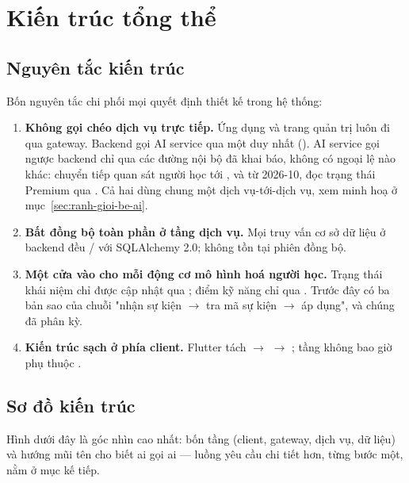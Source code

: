 \chapter{Kiến trúc tổng thể}

\section{Nguyên tắc kiến trúc}

Bốn nguyên tắc chi phối mọi quyết định thiết kế trong hệ thống:

\begin{enumerate}[leftmargin=1.4em]
  \item \textbf{Không gọi chéo dịch vụ trực tiếp.} Ứng dụng và trang quản trị luôn đi
  qua gateway. Backend gọi AI service qua một  duy nhất
  (). AI service gọi ngược backend chỉ qua
  các đường nội bộ đã khai báo, không có ngoại lệ nào khác: chuyển tiếp quan sát
  người học tới , và từ 2026-10, đọc trạng thái
  Premium qua . Cả hai dùng chung một
   dịch vụ-tới-dịch vụ, xem minh hoạ ở mục~\ref{sec:ranh-gioi-be-ai}.
  \item \textbf{Bất đồng bộ toàn phần ở tầng dịch vụ.} Mọi truy vấn cơ sở dữ liệu ở
  backend đều / với SQLAlchemy 2.0; không tồn tại phiên đồng bộ.
  \item \textbf{Một cửa vào cho mỗi động cơ mô hình hoá người học.} Trạng thái khái niệm
  chỉ được cập nhật qua ; điểm kỹ năng chỉ qua
  . Trước đây có ba bản sao của chuỗi
  "nhận sự kiện $\rightarrow$ tra mã sự kiện $\rightarrow$ áp dụng", và chúng đã phân kỳ.
  \item \textbf{Kiến trúc sạch ở phía client.} Flutter tách  $\rightarrow$
   $\rightarrow$ ; tầng  không bao giờ
  phụ thuộc .
\end{enumerate}

\section{Sơ đồ kiến trúc}

Hình dưới đây là góc nhìn cao nhất: bốn tầng (client, gateway, dịch vụ, dữ liệu) và
hướng mũi tên cho biết ai gọi ai — luồng yêu cầu chi tiết hơn, từng bước một, nằm ở
mục kế tiếp.

